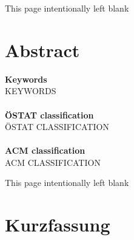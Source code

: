 {
%
%
%
\clearpage
\begin{center}
This page intentionally left blank
\end{center}
\clearpage



\pagestyle{plain}
\setcounter{page}{3}


\section*{Abstract}




\vfill
\noindent
\textbf{Keywords}\\
KEYWORDS\\
\\
\textbf{ÖSTAT classification}\\
ÖSTAT CLASSIFICATION\\
\\
\textbf{ACM classification}\\
ACM CLASSIFICATION

\clearpage
\begin{center}
This page intentionally left blank
\end{center}
\clearpage



\section*{Kurzfassung}



}

